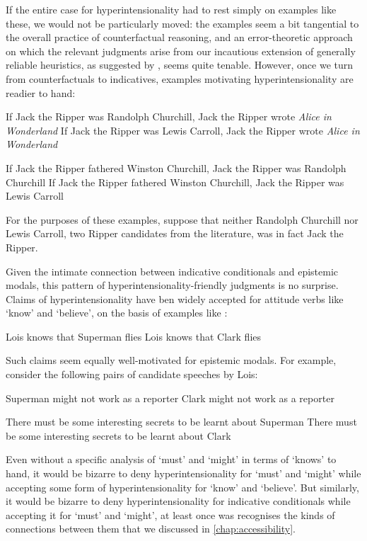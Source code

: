 \documentclass[If.tex]{subfiles}
\begin{document}
If the entire case for hyperintensionality had to rest simply on examples like these, we would not be particularly moved: the examples seem a bit tangential to the overall practice of counterfactual reasoning, and an error-theoretic approach on which the relevant judgments arise from our incautious extension of generally reliable heuristics, as suggested by \citet{WilliamsonCounterpossibls}, seems quite tenable.  However, once we turn from counterfactuals to indicatives, examples motivating hyperintensionality are readier to hand:  
\begin{prop}
	\nitem \label{ripper}
	\begin{prop}
		\aitem
		If Jack the Ripper was Randolph Churchill, Jack the Ripper wrote \emph{Alice in Wonderland}
		\aitem
		If Jack the Ripper was Lewis Carroll, Jack the Ripper wrote \emph{Alice in Wonderland}
	\end{prop}
	\nitem 
	\begin{prop}
		\aitem
		If Jack the Ripper fathered Winston Churchill, Jack the Ripper was Randolph Churchill
		\aitem
		If Jack the Ripper fathered Winston Churchill, Jack the Ripper was Lewis Carroll
	\end{prop}
\end{prop}
For the purposes of these examples, suppose that neither Randolph Churchill nor Lewis Carroll, two Ripper candidates from the literature, was in fact Jack the Ripper.

Given the intimate connection between indicative conditionals and epistemic modals, this pattern of hyperintensionality-friendly judgments is no surprise.  Claims of hyperintensionality have ben widely accepted for attitude verbs like ‘know’ and ‘believe’, on the basis of examples like :
\begin{prop}
	\nitem \label{lois}
	\begin{prop}
		\aitem
		Lois knows that Superman flies
		\aitem
		Lois knows that Clark flies
	\end{prop}
\end{prop}
Such claims seem equally well-motivated for epistemic modals.  For example, consider the following pairs of candidate speeches by Lois:
\begin{prop}
	\nitem
	\begin{prop}
		\aitem
		Superman might not work as a reporter
		\aitem
		Clark might not work as a reporter
	\end{prop}
	\nitem
	\begin{prop}
		\aitem
		There must be some interesting secrets to be learnt about Superman
		\aitem
		There must be some interesting secrets to be learnt about Clark
	\end{prop}
\end{prop}
Even without a specific analysis of ‘must’ and ‘might’ in terms of ‘knows’ to hand, it would be bizarre to deny hyperintensionality for ‘must’ and ‘might’ while accepting some form of hyperintensionality for ‘know’ and ‘believe’.  But similarly, it would be bizarre to deny hyperintensionality for indicative conditionals while accepting it for ‘must’ and ‘might’, at least once was recognises the kinds of connections between them that we discussed in \autoref{chap:accessibility}.
\end{document}
